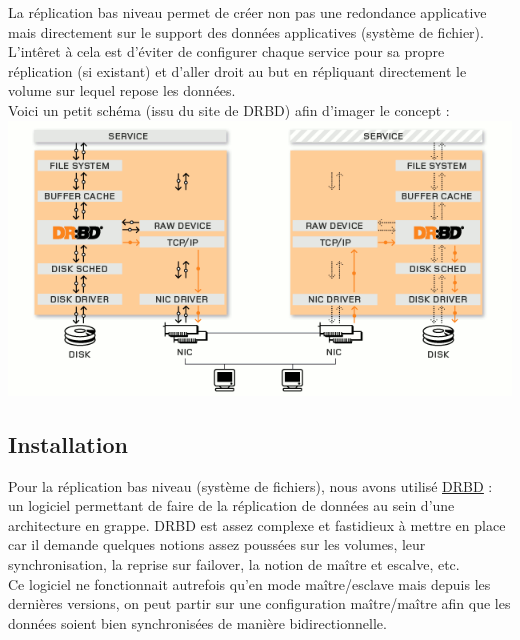 \documentclass[11pt,a4paper]{report}
\begin{document}
            La r\'eplication bas niveau permet de cr\'eer non pas une redondance applicative mais directement sur le support des donn\'ees applicatives (syst\`eme de fichier). L'int\^eret \`a cela est d'\'eviter de configurer chaque service pour sa propre r\'eplication (si existant) et d'aller droit au but en r\'epliquant directement le volume sur lequel repose les donn\'ees.\\
            
            Voici un petit sch\'ema (issu du site de DRBD) afin d'imager le concept : \\
            
            \includegraphics[keepaspectratio=true, width=\textwidth]{content/drbd.png}\\[1cm]
            
            \subsection{Installation}
                
                Pour la r\'eplication bas niveau (syst\`eme de fichiers), nous avons utilis\'e \underline{\href{http://www.drbd.org/}{DRBD}} : un logiciel permettant de faire de la r\'eplication de donn\'ees au sein d'une architecture en grappe. DRBD est assez complexe et fastidieux \`a mettre en place car il demande quelques notions assez pouss\'ees sur les volumes, leur synchronisation, la reprise sur failover, la notion de ma\^itre et escalve, etc.\\
                
                Ce logiciel ne fonctionnait autrefois qu'en mode ma\^itre/esclave mais depuis les derni\`eres versions, on peut partir sur une configuration ma\^itre/ma\^itre afin que les donn\'ees soient bien synchronis\'ees de mani\`ere bidirectionnelle.\\
                
\end{document}
